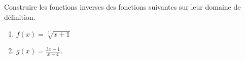 

\begin{exercice}\label{exoINGE11140027}

	Construire les fonctions inverses des fonctions suivantes sur leur domaine de définition.
	\begin{enumerate}

		\item
			$f(x)=\sqrt[5]{x+1}$
		\item
			$g(x)=\frac{ 3x-1 }{ x+4 }$.

	\end{enumerate}

\end{exercice}
